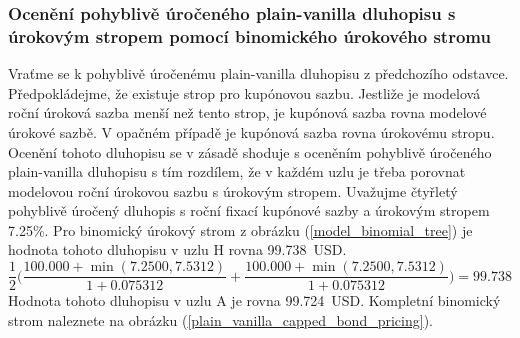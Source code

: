 \documentclass[a4paper]{book}
\begin{document}
\subsubsection{Ocenění pohyblivě úročeného plain-vanilla dluhopisu s úrokovým stropem pomocí binomického úrokového stromu}

Vraťme se k pohyblivě úročenému plain-vanilla dluhopisu z předchozího odstavce. Předpokládejme, že existuje strop pro kupónovou sazbu. Jestliže je modelová roční úroková sazba menší než tento strop, je kupónová sazba rovna modelové úrokové sazbě. V opačném případě je kupónová sazba rovna úrokovému stropu. Ocenění tohoto dluhopisu se v zásadě shoduje s oceněním pohyblivě úročeného plain-vanilla dluhopisu s tím rozdílem, že v každém uzlu je třeba porovnat modelovou roční úrokovou sazbu s úrokovým stropem. Uvažujme čtyřletý pohyblivě úročený dluhopis s roční fixací kupónové sazby a úrokovým stropem 7.25\%. Pro binomický úrokový strom z obrázku (\ref{model_binomial_tree}) je hodnota tohoto dluhopisu v uzlu H rovna 99.738~USD.
\begin{equation*}
\frac{1}{2}\Bigg( \frac{100.000 + \min(7.2500, 7.5312)}{1 + 0.075312} + \frac{100.000 + \min(7.2500, 7.5312)}{1 + 0.075312} \Bigg) = 99.738
\end{equation*}
Hodnota tohoto dluhopisu v uzlu A je rovna 99.724~USD. Kompletní binomický strom naleznete na obrázku (\ref{plain_vanilla_capped_bond_pricing}). 
\end{document}
